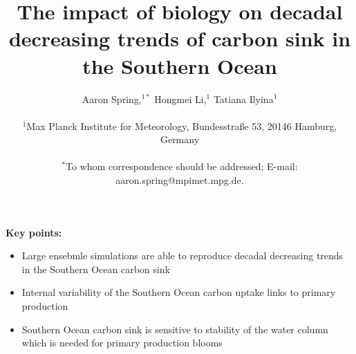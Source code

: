 \documentclass[12pt]{article}
\title{The impact of biology on decadal decreasing trends of carbon sink in the Southern Ocean}
\author
{Aaron Spring,$^{1\ast}$ Hongmei Li,$^{1}$ Tatiana Ilyina$^{1}$\\
\\
\normalsize{$^{1}$Max Planck Institute for Meteorology, Bundesstra{\ss}e 53, 20146 Hamburg, Germany}\\
\\
\normalsize{$^\ast$To whom correspondence should be addressed; E-mail:  aaron.spring@mpimet.mpg.de.}
}
\date{}
\begin{document}
 


\baselineskip24pt


\maketitle 

\vspace{3cm}
\textbf{Key points:}

\begin{itemize}
\item Large ensebmle simulations are able to reproduce decadal decreasing trends in the Southern Ocean carbon sink
\item Internal variability of the Southern Ocean carbon uptake links to primary production
\item Southern Ocean carbon sink is sensitive to stability of the water column which is needed for primary production blooms
\end{itemize}



\newpage
\end{document}
